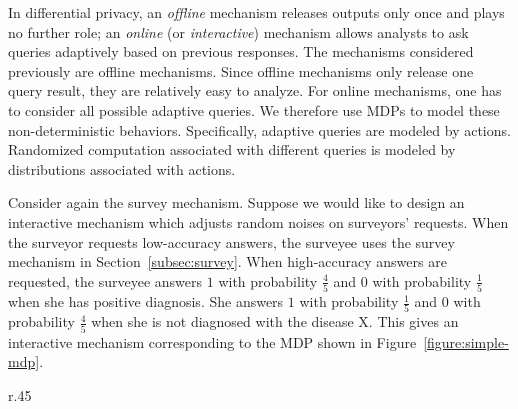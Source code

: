 In differential privacy, an \emph{offline} mechanism releases outputs only
once and plays no further role; an \emph{online} (or \emph{interactive}) mechanism
allows analysts to ask queries adaptively based on previous
responses. The mechanisms considered previously are offline
mechanisms. 
Since offline mechanisms only release one query result, they are
relatively easy to analyze. For online mechanisms, one has to consider
all possible adaptive queries. We therefore use MDPs to model these
non-deterministic behaviors.
Specifically, adaptive queries are modeled by
actions. Randomized computation associated with different queries is
modeled by distributions associated with actions.


Consider again the survey mechanism. Suppose we would like to design
an interactive mechanism which adjusts random noises on surveyors'
requests. When the surveyor requests low-accuracy answers, the
surveyee uses the survey mechanism in Section~\ref{subsec:survey}. 
When high-accuracy
answers are requested, the surveyee answers $1$ with
probability $\frac{4}{5}$ and $0$ with probability $\frac{1}{5}$ when she has
positive diagnosis. She answers $1$ with probability $\frac{1}{5}$
and $0$ with probability $\frac{4}{5}$ when she is not
diagnosed with the disease X. This gives an interactive mechanism
corresponding to the MDP shown in
Figure~\ref{figure:simple-mdp}.

\begin{wrapfigure}[14]{r}{.45\columnwidth}
  \centering
    \caption{Markov Decision Process}
    \label{figure:simple-mdp}
\end{wrapfigure}

